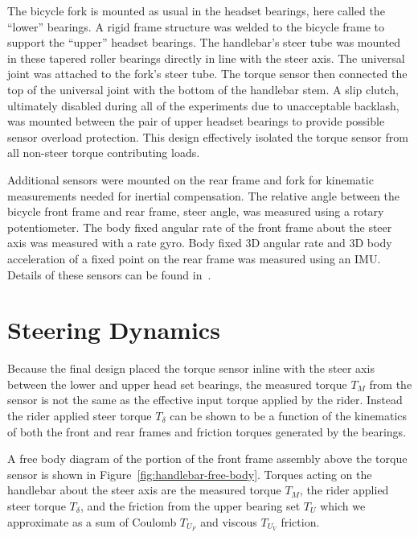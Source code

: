 \documentclass[10pt]{article}
\begin{document}
The bicycle fork is mounted as usual in the headset bearings, here
called the ``lower''  bearings. A rigid frame structure was
welded to the bicycle frame to support the ``upper'' headset bearings. The
handlebar's steer tube was mounted in these tapered roller bearings directly
in line with the steer axis. The universal joint was attached to the fork's
steer tube. The torque sensor then connected the top of the universal joint
with the bottom of the handlebar stem. A slip clutch, ultimately
disabled during all of the experiments due to unacceptable backlash, was mounted between the
pair of upper headset bearings to provide possible sensor overload protection. This
design effectively isolated the torque sensor from all non-steer torque contributing
loads.

Additional sensors were mounted on the rear frame and fork for kinematic
measurements needed for inertial compensation. The relative angle between
the bicycle front frame and rear frame, steer angle, was measured using a
rotary potentiometer. The body fixed angular rate of the front frame about the steer
axis was measured with a rate gyro. Body fixed 3D angular rate and 3D
body acceleration of a fixed point  on the rear frame was measured using an IMU.
Details of these sensors can be found in~\cite{Moore2012}. 


\section*{Steering Dynamics}
\label{sec:steer-dynamics}


Because the final design placed the torque sensor inline with the steer axis between
the lower and upper head set bearings, the measured torque $T_M$ from the
sensor is not the same as the effective input torque applied by the rider. Instead
the rider applied steer torque $T_\delta$ can be shown to be a function of the
kinematics of both the front and rear frames and friction torques generated
by the bearings.

A free body diagram of the portion of the front frame assembly
above the torque sensor is shown in Figure~\ref{fig:handlebar-free-body}. Torques
acting on the handlebar about the steer axis are the measured torque $T_M$, the
rider applied steer torque $T_\delta$, and the friction from the upper bearing
set $T_U$ which we approximate as a sum of Coulomb $T_{U_F}$ and viscous  $T_{U_V}$
friction.
\end{document}
